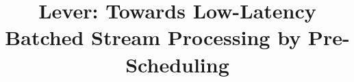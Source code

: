 \documentclass[10pt,conference,compsocconf,letterpaper]{IEEEtran}
\begin{document}
%
\title{Lever: Towards Low-Latency Batched Stream Processing by Pre-Scheduling}


%
%


%




\end{document}
